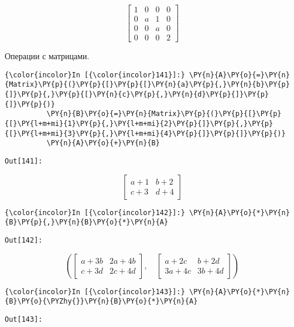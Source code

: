     \[\left[\begin{matrix}1 & 0 & 0 & 0\\0 & a & 1 & 0\\0 & 0 & a & 0\\0 & 0 & 0 & 2\end{matrix}\right]\]

    

    Операции с матрицами.

    \begin{Verbatim}[commandchars=\\\{\}]
{\color{incolor}In [{\color{incolor}141}]:} \PY{n}{A}\PY{o}{=}\PY{n}{Matrix}\PY{p}{(}\PY{p}{[}\PY{p}{[}\PY{n}{a}\PY{p}{,}\PY{n}{b}\PY{p}{]}\PY{p}{,}\PY{p}{[}\PY{n}{c}\PY{p}{,}\PY{n}{d}\PY{p}{]}\PY{p}{]}\PY{p}{)}
          \PY{n}{B}\PY{o}{=}\PY{n}{Matrix}\PY{p}{(}\PY{p}{[}\PY{p}{[}\PY{l+m+mi}{1}\PY{p}{,}\PY{l+m+mi}{2}\PY{p}{]}\PY{p}{,}\PY{p}{[}\PY{l+m+mi}{3}\PY{p}{,}\PY{l+m+mi}{4}\PY{p}{]}\PY{p}{]}\PY{p}{)}
          \PY{n}{A}\PY{o}{+}\PY{n}{B}
\end{Verbatim}
\texttt{\color{outcolor}Out[{\color{outcolor}141}]:}
    
    \[\left[\begin{matrix}a + 1 & b + 2\\c + 3 & d + 4\end{matrix}\right]\]

    

    \begin{Verbatim}[commandchars=\\\{\}]
{\color{incolor}In [{\color{incolor}142}]:} \PY{n}{A}\PY{o}{*}\PY{n}{B}\PY{p}{,}\PY{n}{B}\PY{o}{*}\PY{n}{A}
\end{Verbatim}
\texttt{\color{outcolor}Out[{\color{outcolor}142}]:}
    
    \[\left ( \left[\begin{matrix}a + 3 b & 2 a + 4 b\\c + 3 d & 2 c + 4 d\end{matrix}\right], \quad \left[\begin{matrix}a + 2 c & b + 2 d\\3 a + 4 c & 3 b + 4 d\end{matrix}\right]\right )\]

    

    \begin{Verbatim}[commandchars=\\\{\}]
{\color{incolor}In [{\color{incolor}143}]:} \PY{n}{A}\PY{o}{*}\PY{n}{B}\PY{o}{\PYZhy{}}\PY{n}{B}\PY{o}{*}\PY{n}{A}
\end{Verbatim}
\texttt{\color{outcolor}Out[{\color{outcolor}143}]:}
    
